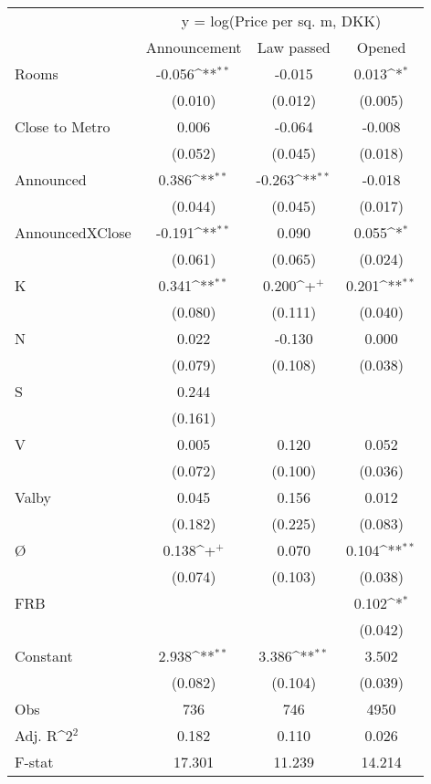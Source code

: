 {
\def\sym#1{\ifmmode^{#1}\else\(^{#1}\)\fi}
\begin{tabular}{@{\extracolsep{2pt}}l*{3}{c}@{}}
\hline\hline
& \multicolumn{3}{c}{y = log(Price per sq. m, DKK)} \\
\cline{2-4}
 & Announcement & Law passed & Opened \\
\hline
Rooms & -0.056\sym{**} & -0.015 & 0.013\sym{*} \\
 & (0.010) & (0.012) & (0.005) \\
Close to Metro & 0.006 & -0.064 & -0.008 \\
 & (0.052) & (0.045) & (0.018) \\
Announced & 0.386\sym{**} & -0.263\sym{**} & -0.018 \\
 & (0.044) & (0.045) & (0.017) \\
AnnouncedXClose & -0.191\sym{**} & 0.090 & 0.055\sym{*} \\
 & (0.061) & (0.065) & (0.024) \\
K & 0.341\sym{**} & 0.200\sym{+} & 0.201\sym{**} \\
 & (0.080) & (0.111) & (0.040) \\
N & 0.022 & -0.130 & 0.000 \\
 & (0.079) & (0.108) & (0.038) \\
S & 0.244 &  &  \\
 & (0.161) &  &  \\
V & 0.005 & 0.120 & 0.052 \\
 & (0.072) & (0.100) & (0.036) \\
Valby & 0.045 & 0.156 & 0.012 \\
 & (0.182) & (0.225) & (0.083) \\
Ø & 0.138\sym{+} & 0.070 & 0.104\sym{**} \\
 & (0.074) & (0.103) & (0.038) \\
FRB &  &  & 0.102\sym{*} \\
 &  &  & (0.042) \\
Constant & 2.938\sym{**} & 3.386\sym{**} & 3.502 \\
 & (0.082) & (0.104) & (0.039) \\

\hline
Obs & 736 & 746 & 4950 \\
Adj. R\sym{2} & 0.182 & 0.110 & 0.026 \\
F-stat & 17.301 & 11.239 & 14.214 \\
\hline\hline
\end{tabular}
}